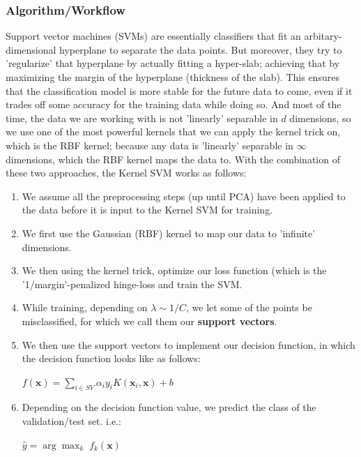 \documentclass[10pt]{article} %
\begin{document}
\subsubsection{Algorithm/Workflow}
Support vector machines (SVMs) are essentially classifiers that fit an arbitary-dimensional hyperplane to separate the data points. But moreover, they try to 'regularize' that hyperplane by actually fitting a hyper-slab; achieving that by maximizing the margin of the hyperplane (thickness of the slab). This ensures that the classification model is more stable for the future data to come, even if it trades off some accuracy for the training data while doing so. And most of the time, the data we are working with is not 'linearly' separable in $d$ dimensions, so we use one of the most powerful kernels that we can apply the kernel trick on, which is the RBF kernel; because any data is 'linearly' separable in $\infty$ dimensions, which the RBF kernel maps the data to. With the combination of these two approaches, the Kernel SVM works as follows:\begin{enumerate}
    \item We assume all the preprocessing steps (up until PCA) have been applied to the data before it is input to the Kernel SVM for training.
    \item We first use the Gaussian (RBF) kernel to map our data to 'infinite' dimensions.
    \item We then using the kernel trick, optimize our loss function (which is the '1/margin'-penalized hinge-loss and train the SVM.
    \item While training, depending on $\lambda \sim 1/C$, we let some of the points be misclassified, for which we call them our \textbf{support vectors}.
    \item We then use the support vectors to implement our decision function, in which the decision function looks like as follows:\begin{center}
$f(\mathbf{x}) = \sum_{i \in SV} \alpha_i y_i K(\mathbf{x}_i, \mathbf{x}) + b$
    \end{center}
    \item Depending on the decision function value, we predict the class of the validation/test set. i.e.:\begin{center}
        $\hat{y} = \arg\max_{k} \; f_k(\mathbf{x})$
    \end{center}
\end{enumerate}
\end{document}
